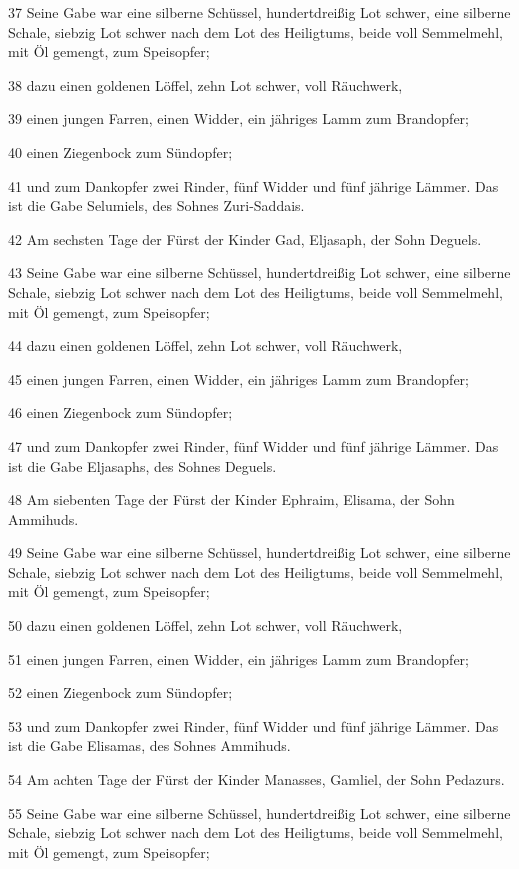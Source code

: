 \par 37 Seine Gabe war eine silberne Schüssel, hundertdreißig Lot schwer, eine silberne Schale, siebzig Lot schwer nach dem Lot des Heiligtums, beide voll Semmelmehl, mit Öl gemengt, zum Speisopfer;
\par 38 dazu einen goldenen Löffel, zehn Lot schwer, voll Räuchwerk,
\par 39 einen jungen Farren, einen Widder, ein jähriges Lamm zum Brandopfer;
\par 40 einen Ziegenbock zum Sündopfer;
\par 41 und zum Dankopfer zwei Rinder, fünf Widder und fünf jährige Lämmer. Das ist die Gabe Selumiels, des Sohnes Zuri-Saddais.
\par 42 Am sechsten Tage der Fürst der Kinder Gad, Eljasaph, der Sohn Deguels.
\par 43 Seine Gabe war eine silberne Schüssel, hundertdreißig Lot schwer, eine silberne Schale, siebzig Lot schwer nach dem Lot des Heiligtums, beide voll Semmelmehl, mit Öl gemengt, zum Speisopfer;
\par 44 dazu einen goldenen Löffel, zehn Lot schwer, voll Räuchwerk,
\par 45 einen jungen Farren, einen Widder, ein jähriges Lamm zum Brandopfer;
\par 46 einen Ziegenbock zum Sündopfer;
\par 47 und zum Dankopfer zwei Rinder, fünf Widder und fünf jährige Lämmer. Das ist die Gabe Eljasaphs, des Sohnes Deguels.
\par 48 Am siebenten Tage der Fürst der Kinder Ephraim, Elisama, der Sohn Ammihuds.
\par 49 Seine Gabe war eine silberne Schüssel, hundertdreißig Lot schwer, eine silberne Schale, siebzig Lot schwer nach dem Lot des Heiligtums, beide voll Semmelmehl, mit Öl gemengt, zum Speisopfer;
\par 50 dazu einen goldenen Löffel, zehn Lot schwer, voll Räuchwerk,
\par 51 einen jungen Farren, einen Widder, ein jähriges Lamm zum Brandopfer;
\par 52 einen Ziegenbock zum Sündopfer;
\par 53 und zum Dankopfer zwei Rinder, fünf Widder und fünf jährige Lämmer. Das ist die Gabe Elisamas, des Sohnes Ammihuds.
\par 54 Am achten Tage der Fürst der Kinder Manasses, Gamliel, der Sohn Pedazurs.
\par 55 Seine Gabe war eine silberne Schüssel, hundertdreißig Lot schwer, eine silberne Schale, siebzig Lot schwer nach dem Lot des Heiligtums, beide voll Semmelmehl, mit Öl gemengt, zum Speisopfer;
